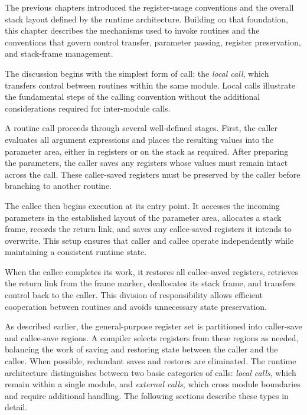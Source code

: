 %
%

The previous chapters introduced the register-usage conventions and the overall stack layout defined by the runtime architecture. Building on that foundation, this chapter describes the mechanisms used to invoke routines and the conventions that govern control transfer, parameter passing, register preservation, and stack-frame management.

The discussion begins with the simplest form of call: the \emph{local call}, which transfers control between routines within the same module. Local calls illustrate the fundamental steps of the calling convention without the additional considerations required for inter-module calls.


A routine call proceeds through several well-defined stages. First, the caller evaluates all argument expressions and places the resulting values into the parameter area, either in registers or on the stack as required. After preparing the parameters, the caller saves any registers whose values must remain intact across the call. These caller-saved registers must be preserved by the caller before branching to another routine.

The callee then begins execution at its entry point. It accesses the incoming parameters in the established layout of the parameter area, allocates a stack frame, records the return link, and saves any callee-saved registers it intends to overwrite. This setup ensures that caller and callee operate independently while maintaining a consistent runtime state.

When the callee completes its work, it restores all callee-saved registers, retrieves the return link from the frame marker, deallocates its stack frame, and transfers control back to the caller. This division of responsibility allows efficient cooperation between routines and avoids unnecessary state preservation.

As described earlier, the general-purpose register set is partitioned into caller-save and callee-save regions. A compiler selects registers from these regions as needed, balancing the work of saving and restoring state between the caller and the callee. When possible, redundant saves and restores are eliminated. The runtime architecture distinguishes between two basic categories of calls: \emph{local calls}, which remain within a single module, and \emph{external calls}, which cross module boundaries and require additional handling. The following sections describe these types in detail.

